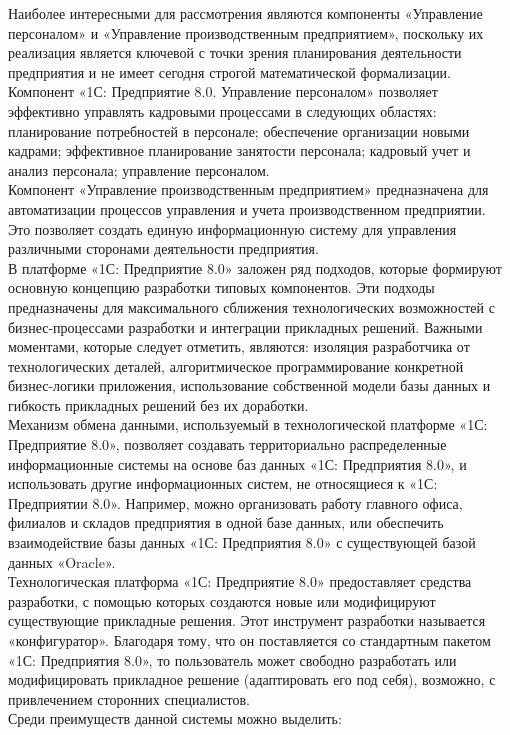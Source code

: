 \indent Наиболее интересными для рассмотрения являются компоненты «Управление персоналом» и «Управление производственным предприятием», поскольку их реализация является ключевой с точки зрения планирования деятельности предприятия и не имеет сегодня строгой математической формализации.\\
\indent Компонент «1С: Предприятие 8.0. Управление персоналом» позволяет эффективно управлять кадровыми процессами в следующих областях: планирование потребностей в персонале; обеспечение организации новыми кадрами; эффективное планирование занятости персонала; кадровый учет и анализ персонала; управление персоналом.\\
\indent Компонент «Управление производственным предприятием» предназначена для автоматизации процессов управления и учета производственном предприятии.
Это позволяет создать единую информационную систему для управления различными сторонами деятельности предприятия.\\
\indent В платформе «1С: Предприятие 8.0» заложен ряд подходов, которые формируют основную концепцию разработки типовых компонентов. 
Эти подходы предназначены для максимального сближения технологических возможностей с бизнес-процессами разработки и интеграции прикладных решений.
Важными моментами, которые следует отметить, являются: изоляция разработчика от технологических деталей, алгоритмическое программирование конкретной бизнес-логики приложения, использование собственной модели базы данных и гибкость прикладных решений без их доработки.\\
\indent Механизм обмена данными, используемый в технологической платформе «1С: Предприятие 8.0», позволяет создавать территориально распределенные информационные системы на основе баз данных «1С: Предприятия 8.0», и использовать другие информационных систем, не относящиеся к «1С: Предприятии 8.0».
Например, можно организовать работу главного офиса, филиалов и складов предприятия в одной базе данных, или обеспечить взаимодействие базы данных «1С: Предприятия 8.0» с существующей базой данных «Oracle».\\
\indent Технологическая платформа «1С: Предприятие 8.0» предоставляет средства разработки, с помощью которых создаются новые или модифицируют существующие прикладные решения.
Этот инструмент разработки называется «конфигуратор».
Благодаря тому, что он поставляется со стандартным пакетом «1С: Предприятия 8.0», то пользователь может свободно разработать или модифицировать прикладное решение (адаптировать его под себя), возможно, с привлечением сторонних специалистов.\\
\indent Среди преимуществ данной системы можно выделить:

